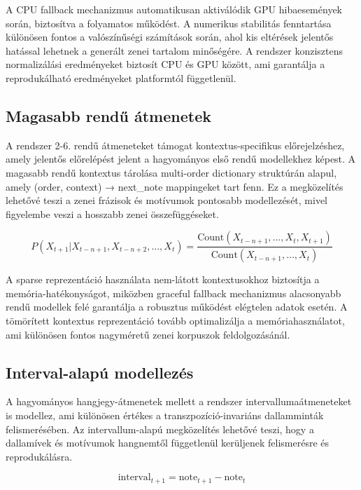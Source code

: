 A CPU fallback mechanizmus automatikusan aktiválódik GPU hibaesemények során, biztosítva a folyamatos működést. A numerikus stabilitás fenntartása különösen fontos a valószínűségi számítások során, ahol kis eltérések jelentős hatással lehetnek a generált zenei tartalom minőségére. A rendszer konzisztens normalizálási eredményeket biztosít CPU és GPU között, ami garantálja a reprodukálható eredményeket platformtól függetlenül.

\subsection{Magasabb rendű átmenetek}

A rendszer 2-6. rendű átmeneteket támogat kontextus-specifikus előrejelzéshez, amely jelentős előrelépést jelent a hagyományos első rendű modellekhez képest. A magasabb rendű kontextus tárolása multi-order dictionary struktúrán alapul, amely (order, context) → next_note mappingeket tart fenn. Ez a megközelítés lehetővé teszi a zenei frázisok és motívumok pontosabb modellezését, mivel figyelembe veszi a hosszabb zenei összefüggéseket.

\begin{equation}
P(X_{t+1} | X_{t-n+1}, X_{t-n+2}, \ldots, X_t) = \frac{\text{Count}(X_{t-n+1}, \ldots, X_t, X_{t+1})}{\text{Count}(X_{t-n+1}, \ldots, X_t)}
\end{equation}

A sparse reprezentáció használata nem-látott kontextusokhoz biztosítja a memória-hatékonyságot, miközben graceful fallback mechanizmus alacsonyabb rendű modellek felé garantálja a robusztus működést elégtelen adatok esetén. A tömörített kontextus reprezentáció tovább optimalizálja a memóriahasználatot, ami különösen fontos nagyméretű zenei korpuszok feldolgozásánál.

\subsection{Interval-alapú modellezés}

A hagyományos hangjegy-átmenetek mellett a rendszer intervallumaátmeneteket is modellez, ami különösen értékes a transzpozíció-invariáns dallamminták felismerésében. Az intervallum-alapú megközelítés lehetővé teszi, hogy a dallamívek és motívumok hangnemtől függetlenül kerüljenek felismerésre és reprodukálásra.

\begin{equation}
\text{interval}_{t+1} = \text{note}_{t+1} - \text{note}_t
\end{equation}


